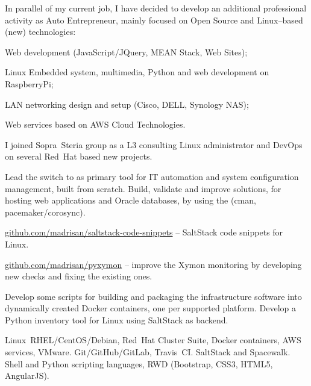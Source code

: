 
In parallel of my current job, I have decided to develop an additional professional
activity as Auto Entrepreneur, mainly focused on Open Source and Linux--based (new) technologies:

\item{\bdot} Web development (JavaScript/JQuery, MEAN Stack, Web Sites);
\item{\bdot} Linux Embedded system, multimedia, Python and web development on RaspberryPi;
\item{\bdot} LAN networking design and setup (Cisco, DELL, Synology NAS);
\item{\bdot} Web services based on AWS Cloud Technologies.



I joined Sopra~Steria group as a L3 consulting Linux administrator and DevOps on
several Red~Hat based new projects.

\smallskip\noindent
\tasks
Lead the switch to  as primary tool for IT automation and system
configuration management, built from scratch.
Build, validate and improve  solutions,
for hosting web applications and Oracle databases, by using the
 (cman, pacemaker/corosync).

\smallskip\noindent
\software
\url{github.com/madrisan/saltstack-code-snippets} --
SaltStack code snippets for Linux.

\tinyskip\noindent
\url{github.com/madrisan/pyxymon} --
improve the Xymon monitoring by developing new checks and fixing the
existing ones.

\tinyskip\noindent
Develop some scripts for building and packaging the infrastructure software
into dynamically created Docker containers, one per supported platform.
Develop a Python inventory tool for Linux using SaltStack as backend.

\tinyskip\noindent
\technologies
Linux~RHEL/CentOS/Debian, Red~Hat Cluster Suite, Docker containers,
AWS services, VMware. Git/GitHub/GitLab, Travis~CI. SaltStack and Spacewalk.
Shell and Python scripting languages, RWD (Bootstrap, CSS3, HTML5, AngularJS).


